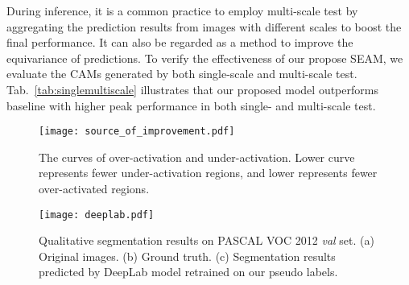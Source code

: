 \documentclass[10pt,twocolumn,letterpaper]{article}
\begin{document}
	During inference, it is a common practice to employ multi-scale test by aggregating the prediction results from images with different scales to boost the final performance. It can also be regarded as a method to improve the equivariance of predictions. To verify the effectiveness of our propose SEAM, we evaluate the CAMs generated by both single-scale and multi-scale test. Tab.~\ref{tab:singlemultiscale} illustrates that our proposed model outperforms baseline with higher peak performance in both single- and multi-scale test.
	\begin{figure}[t]
		\centering
		\texttt{[image: source\_of\_improvement.pdf]}
		\caption{The curves of over-activation and under-activation. Lower  curve represents fewer under-activation regions, and lower  represents fewer over-activated regions.}
		\label{fig:source}
\end{figure}
	\begin{figure*}[t]
		\centering
		\texttt{[image: deeplab.pdf]}
		\caption{Qualitative segmentation results on PASCAL VOC 2012 \textit{val} set. (a) Original images. (b) Ground truth. (c) Segmentation results predicted by DeepLab model retrained on our pseudo labels.}
		\label{fig:deeplab}
\end{figure*}
\end{document}
